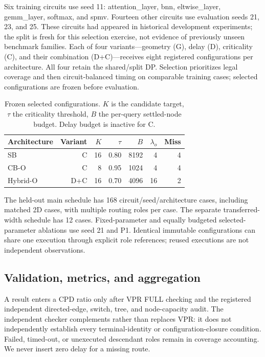 \documentclass[conference,10pt]{IEEEtran}
\begin{document}
Six training circuits use seed 11: attention\_layer, bnn, eltwise\_layer, gemm\_layer, softmax, and spmv. Fourteen other circuits use evaluation seeds 21, 23, and 25. These circuits had appeared in historical development experiments; the split is fresh for this selection exercise, not evidence of previously unseen benchmark families. Each of four variants---geometry (G), delay (D), criticality (C), and their combination (D+C)---receives eight registered configurations per architecture. All four retain the shared/split DP. Selection prioritizes legal coverage and then circuit-balanced timing on comparable training cases; selected configurations are frozen before evaluation.

\begin{table}[h]
\centering\caption{Frozen selected configurations. $K$ is the candidate target, $\tau$ the criticality threshold, $B$ the per-query settled-node budget. Delay budget is inactive for C.}
\label{tab:config}
\begin{tabular}{lrrrrrr}\hline
Architecture & Variant & $K$ & $\tau$ & $B$ & $\lambda_o$ & Miss\\\hline
SB & C &16&0.80&8192&4&4\\
CB-O & C &8&0.95&1024&4&4\\
Hybrid-O & D+C &16&0.70&4096&16&2\\\hline
\end{tabular}
\end{table}
The held-out main schedule has 168 circuit/seed/architecture cases, including matched 2D cases, with multiple routing roles per case. The separate transferred-width schedule has 12 cases. Fixed-parameter and equally budgeted selected-parameter ablations use seed 21 and P1. Identical immutable configurations can share one execution through explicit role references; reused executions are not independent observations.

\subsection{Validation, metrics, and aggregation}
A result enters a CPD ratio only after VPR FULL checking and the registered independent directed-edge, switch, tree, and node-capacity audit. The independent checker complements rather than replaces VPR: it does not independently establish every terminal-identity or configuration-closure condition. Failed, timed-out, or unexecuted descendant roles remain in coverage accounting. We never insert zero delay for a missing route.
\end{document}
